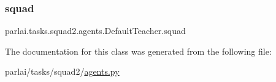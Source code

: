 \subsubsection{\texorpdfstring{squad}{squad}}
{\footnotesize\ttfamily parlai.\+tasks.\+squad2.\+agents.\+Default\+Teacher.\+squad}



The documentation for this class was generated from the following file\+:\begin{DoxyCompactItemize}
\item 
parlai/tasks/squad2/\hyperlink{parlai_2tasks_2squad2_2agents_8py}{agents.\+py}\end{DoxyCompactItemize}
